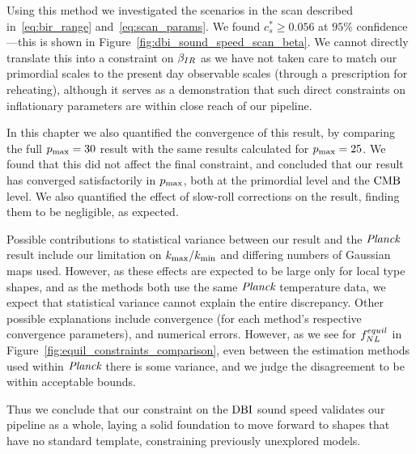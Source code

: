     Using this method we investigated the scenarios in the scan described in~\eqref{eq:bir_range}
    and~\eqref{eq:scan_params}. We found $c_s^*\ge0.056$ at $95\%$ confidence---this
    is shown in Figure~\ref{fig:dbi_sound_speed_scan_beta}.
    We cannot directly translate this into a constraint on $\beta_{IR}$ as we have not
    taken care to match our primordial scales to the present day observable scales
    (through a prescription for reheating), although it serves as a demonstration
    that such direct constraints on inflationary parameters are within close reach
    of our pipeline.


    In this chapter we also quantified the convergence of this result, by comparing the full $p_\text{max}=30$
    result with the same results calculated for $p_\text{max}=25$. We found that this did not affect the
    final constraint, and concluded that our result has converged satisfactorily in $p_\text{max}$,
    both at the primordial level and the $\text{CMB}$ level.
    We also quantified the effect of slow-roll corrections on the result,
    finding them to be negligible, as expected.


    Possible contributions to statistical variance between our result and the $\textit{Planck}$ result
    include our limitation on ${k_\text{max}}/{k_\text{min}}$ and differing numbers of Gaussian maps used.
    However, as these effects are expected to be large only for local
    type shapes, and as the methods both use the same $\textit{Planck}$ temperature data,
    we expect that statistical variance cannot explain the entire discrepancy.
    Other possible explanations include
    convergence (for each method's respective convergence parameters),
    and numerical errors.
    However, as we see for $f^{equil}_{NL}$ in Figure~\ref{fig:equil_constraints_comparison},
    even between the estimation methods used within $\textit{Planck}$ there is some variance,
    and we judge the disagreement to be within acceptable bounds.


    Thus we conclude that our constraint on the $\text{DBI}$ sound speed validates our pipeline as a whole,
    laying a solid foundation to move forward to shapes that have no standard template,
    constraining previously unexplored models.


